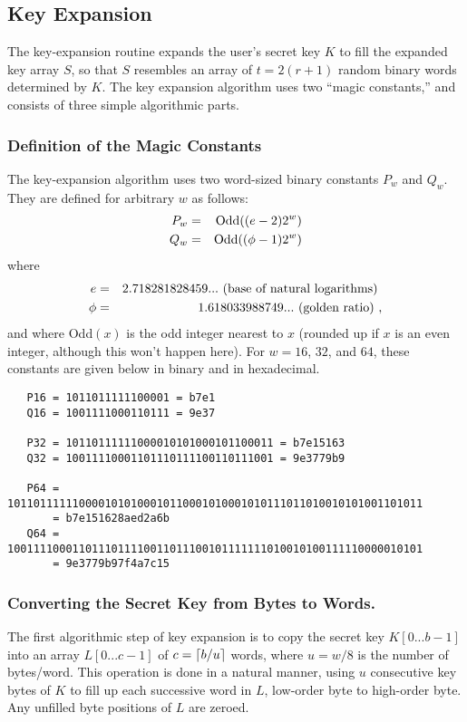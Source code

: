 \subsection{Key Expansion}

The key-expansion routine expands the user's secret key $K$ to fill the
expanded key array $S$, so that $S$ resembles an array of $t=2(r+1)$
random binary words determined by $K$.  The key
expansion algorithm uses two ``magic constants,'' and consists of
three simple algorithmic parts.

\subsubsection{Definition of the Magic Constants}

The key-expansion algorithm uses two word-sized binary constants
$P_w$ and $Q_w$.  They are defined for arbitrary $w$ as follows:  
\begin{eqnarray}
	P_w & = & \hbox{Odd}((e-2) 2^w) \\
	Q_w & = & \hbox{Odd}((\phi-1) 2^w)
\end{eqnarray}
where 
\begin{eqnarray*}
	e    & = & 2.718281828459... \hbox{~(base of natural logarithms)~}\\
	\phi & = & 1.618033988749... \hbox{~(golden ratio)~},
\end{eqnarray*}
and where
Odd$(x)$ is the odd integer nearest to $x$ (rounded up if $x$ is an even
integer, although this won't happen here).
For $w=16$, $32$, and $64$, these constants are given below
in binary and in hexadecimal.  
{\small
\begin{verbatim}
   P16 = 1011011111100001 = b7e1
   Q16 = 1001111000110111 = 9e37   

   P32 = 10110111111000010101000101100011 = b7e15163   
   Q32 = 10011110001101110111100110111001 = 9e3779b9   

   P64 = 1011011111100001010100010110001010001010111011010010101001101011  
       = b7e151628aed2a6b
   Q64 = 1001111000110111011110011011100101111111010010100111110000010101  
       = 9e3779b97f4a7c15
\end{verbatim}
}

\subsubsection{Converting the Secret Key from Bytes to Words.}

The first algorithmic step of key expansion is to copy the secret key
$K[0...b-1]$ into an array $L[0...c-1]$ of $c = \lceil b/u \rceil$ words,
where $u=w/8$ is the number of bytes/word.  This operation is done in
a natural manner, using $u$ consecutive key bytes of $K$ to fill up
each successive word in $L$, low-order byte to high-order byte.
Any unfilled byte positions of $L$ are zeroed.


